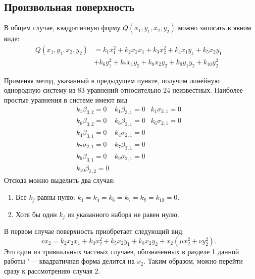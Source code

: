 \documentclass[../main.tex]{subfiles}
\begin{document}
\subsection{Произвольная поверхность}
В общем случае, квадратичную форму $Q(x_1, y_1, x_2, y_2)$ можно записать в явном виде:
\begin{align*}
Q(x_1, y_1, x_2, y_2) &= k_1 x_1^2 + k_2 x_2 x_1 + k_3 x_2^2 + k_4 x_1 y_1 + k_5 x_2 y_1 \\
&+ k_6 y_1^2 + k_7 x_1 y_2 + k_8 x_2 y_2 + k_9 y_1 y_2 + k_{10} y_2^2
\end{align*}

Применяя метод, указанный в предыдущем пункте, получим линейную однородную систему из 83 уравнений относительно 24 неизвестных. Наиболее простые уравнения в системе имеют вид
\begin{equation}
\begin{matrix}
 k_1 \beta _{3,2}=0 &  k_1 \beta _{3,1}=0 &  k_1 \sigma _{2,1}=0 \\
 k_6 \beta _{3,2}=0 & k_6 \beta _{3,1}=0 & k_6 \sigma _{2,1}=0 \\
 k_4 \beta _{3,1}=0 &  k_4 \sigma _{2,1}=0 \\
 k_7 \sigma _{2,1}=0 & k_7 \beta _{3,1}=0 \\
 k_9 \beta _{3,1}=0 & k_9 \sigma _{2,1}=0 \\
 k_{10} \beta _{3,2}=0 &  & 
\end{matrix}
\end{equation}
Отсюда можно выделить два случая:
\begin{enumerate}
	\item Все $k_j$ равны нулю: $k_1 = k_4 = k_6 = k_7 = k_9 = k_{10} = 0$.
	\item Хотя бы один $k_j$ из указанного набора не равен нулю.
\end{enumerate}
В первом случае поверхность приобретает следующий вид:
\begin{equation*}
v x_2 = k_2 x_2 x_1 + k_3 x_2^2 + k_5 x_2 y_1 + k_8 x_2 y_2 + x_2 (\mu x_2^2 + \nu y_2^2).
\end{equation*}
Это один из тривиальных частных случаев, обозначенных в разделе 1 данной работы "--- квадратичная форма делится на $x_2$. Таким образом, можно перейти сразу к рассмотрению случая 2.
\end{document}

